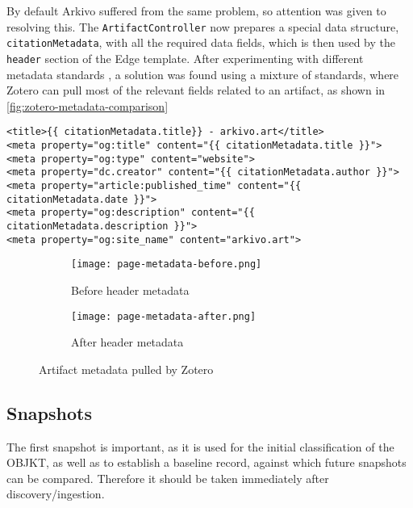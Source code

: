 By default Arkivo suffered from the same problem, so attention was given to resolving this.
The \texttt{ArtifactController} now prepares a special data structure, \texttt{citationMetadata}, with all the required data fields, which is then used by the \texttt{header} section of the Edge template.
After experimenting with different metadata standards \cite{DevExposing_metadataZotero}\cite{zahidOpenGraphMeta2023} , a solution was found using a mixture of standards, where Zotero can pull most of the relevant fields related to an artifact, as shown in \autoref{fig:zotero-metadata-comparison}


\begin{lstlisting}[style=htmlCode,caption={Artifact page metadata}] 
<title>{{ citationMetadata.title}} - arkivo.art</title>
<meta property="og:title" content="{{ citationMetadata.title }}">
<meta property="og:type" content="website">
<meta property="dc.creator" content="{{ citationMetadata.author }}">
<meta property="article:published_time" content="{{ citationMetadata.date }}">
<meta property="og:description" content="{{ citationMetadata.description }}">
<meta property="og:site_name" content="arkivo.art">
\end{lstlisting}


\begin{figure}[H]
  \centering
  \begin{subfigure}[b]{0.45\textwidth}
    \centering
    \texttt{[image: page-metadata-before.png]}
    \caption{Before header metadata}
    \label{fig:image1}
  \end{subfigure}
  \hfill
  \begin{subfigure}[b]{0.45\textwidth}
    \centering
    \texttt{[image: page-metadata-after.png]}
    \caption{After header metadata}
    \label{fig:image2}
  \end{subfigure}
  \caption{Artifact metadata pulled by Zotero}
  \label{fig:zotero-metadata-comparison}
\end{figure}



\subsection{Snapshots}

The first snapshot is important, as it is used for the initial classification of the OBJKT, as well as to establish a baseline record, against which future snapshots can be compared.
Therefore it should be taken immediately after discovery/ingestion.



